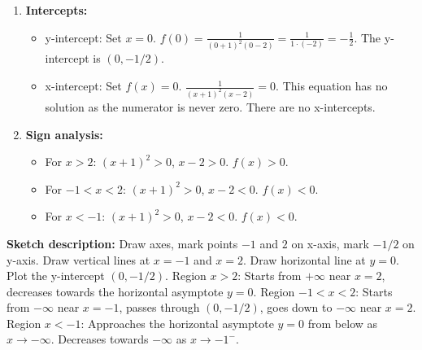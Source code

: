 \documentclass{article}
\begin{document}
\begin{enumerate}
\begin{enumerate}
\begin{itemize}
\begin{itemize}
                    \end{itemize}
            \end{itemize}
        \item \textbf{Intercepts:}
            \begin{itemize}
                \item y-intercept: Set \(x=0\). \(f(0) = \frac{1}{(0+1)^2 (0-2)} = \frac{1}{1 \cdot (-2)} = -\frac{1}{2}\). The y-intercept is \((0, -1/2)\).
                \item x-intercept: Set \(f(x)=0\). \(\frac{1}{(x+1)^2 (x-2)} = 0\). This equation has no solution as the numerator is never zero. There are no x-intercepts.
            \end{itemize}
        \item \textbf{Sign analysis:}
            \begin{itemize}
                \item For \(x > 2\): \((x+1)^2 > 0\), \(x-2 > 0\). \(f(x) > 0\).
                \item For \(-1 < x < 2\): \((x+1)^2 > 0\), \(x-2 < 0\). \(f(x) < 0\).
                \item For \(x < -1\): \((x+1)^2 > 0\), \(x-2 < 0\). \(f(x) < 0\).
            \end{itemize}
    \end{enumerate}

    \textbf{Sketch description:}
    Draw axes, mark points \(-1\) and \(2\) on x-axis, mark \(-1/2\) on y-axis. Draw vertical lines at \(x=-1\) and \(x=2\). Draw horizontal line at \(y=0\). Plot the y-intercept \((0, -1/2)\). Region \(x>2\): Starts from \(+\infty\) near \(x=2\), decreases towards the horizontal asymptote \(y=0\). Region \(-1 < x < 2\): Starts from \(-\infty\) near \(x=-1\), passes through \((0, -1/2)\), goes down to \(-\infty\) near \(x=2\). Region \(x<-1\): Approaches the horizontal asymptote \(y=0\) from below as \(x \to -\infty\). Decreases towards \(-\infty\) as \(x \to -1^-\).


\end{enumerate}
\end{document}
